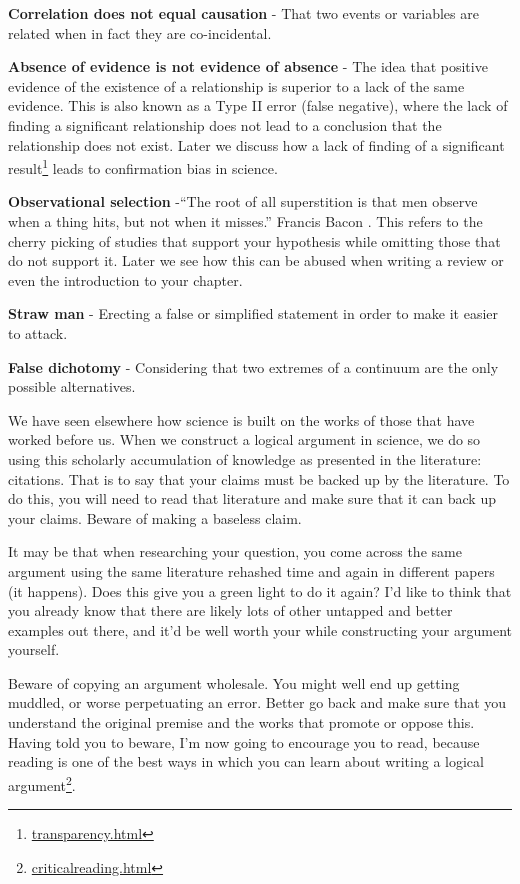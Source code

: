 \documentclass[
]{krantz}
\renewcommand{\href}[2]{#2\footnote{\url{#1}}}
\begin{document}
\textbf{Correlation does not equal causation} - That two events or variables are related when in fact they are co-incidental.

\textbf{Absence of evidence is not evidence of absence} - The idea that positive evidence of the existence of a relationship is superior to a lack of the same evidence. This is also known as a Type II error (false negative), where the lack of finding a significant relationship does not lead to a conclusion that the relationship does not exist. Later we discuss how a \href{transparency.html}{lack of finding of a significant result} leads to confirmation bias in science.

\textbf{Observational selection} -``The root of all superstition is that men observe when a thing hits, but not when it misses.'' Francis Bacon \citeyearpar{bacon1620novum}. This refers to the cherry picking of studies that support your hypothesis while omitting those that do not support it. Later we see how this can be abused when writing a review or even the introduction to your chapter.

\textbf{Straw man} - Erecting a false or simplified statement in order to make it easier to attack.

\textbf{False dichotomy} - Considering that two extremes of a continuum are the only possible alternatives.

We have seen elsewhere how science is built on the works of those that have worked before us. When we construct a logical argument in science, we do so using this scholarly accumulation of knowledge as presented in the literature: citations. That is to say that your claims must be backed up by the literature. To do this, you will need to read that literature and make sure that it can back up your claims. Beware of making a baseless claim.

It may be that when researching your question, you come across the same argument using the same literature rehashed time and again in different papers (it happens). Does this give you a green light to do it again? I'd like to think that you already know that there are likely lots of other untapped and better examples out there, and it'd be well worth your while constructing your argument yourself.

Beware of copying an argument wholesale. You might well end up getting muddled, or worse perpetuating an error. Better go back and make sure that you understand the original premise and the works that promote or oppose this. Having told you to beware, I'm now going to encourage you to read, because \href{criticalreading.html}{reading is one of the best ways in which you can learn about writing a logical argument}.
\end{document}
